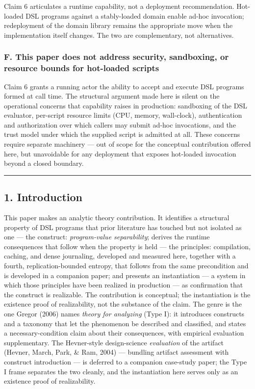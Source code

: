 \documentclass[
]{article}
\begin{document}
Claim 6 articulates a runtime capability, not a deployment
recommendation. Hot-loaded DSL programs against a stably-loaded domain
enable ad-hoc invocation; redeployment of the domain library remains the
appropriate move when the implementation itself changes. The two are
complementary, not alternatives.

\subsubsection{F. This paper does not address security, sandboxing, or
resource bounds for hot-loaded
scripts}\label{f.-this-paper-does-not-address-security-sandboxing-or-resource-bounds-for-hot-loaded-scripts}

Claim 6 grants a running actor the ability to accept and execute DSL
programs formed at call time. The structural argument made here is
silent on the operational concerns that capability raises in production:
sandboxing of the DSL evaluator, per-script resource limits (CPU,
memory, wall-clock), authentication and authorization over which callers
may submit ad-hoc invocations, and the trust model under which the
supplied script is admitted at all. These concerns require separate
machinery --- out of scope for the conceptual contribution offered here,
but unavoidable for any deployment that exposes hot-loaded invocation
beyond a closed boundary.

\begin{center}\rule{0.5\linewidth}{0.5pt}\end{center}

\subsection{1. Introduction}\label{introduction}

This paper makes an analytic theory contribution. It identifies a
structural property of DSL programs that prior literature has touched
but not isolated as one --- the construct: \emph{program-value
separability}; derives the runtime consequences that follow when the
property is held --- the principles: compilation, caching, and dense
journaling, developed and measured here, together with a fourth,
replication-bounded entropy, that follows from the same precondition and
is developed in a companion paper; and presents an instantiation --- a
system in which those principles have been realized in production --- as
confirmation that the construct is realizable. The contribution is
conceptual; the instantiation is the existence proof of realizability,
not the substance of the claim. The genre is the one Gregor (2006) names
\emph{theory for analyzing} (Type I): it introduces constructs and a
taxonomy that let the phenomenon be described and classified, and states
a necessary-condition claim about their consequences, with empirical
evaluation supplementary. The Hevner-style design-science
\emph{evaluation} of the artifact (Hevner, March, Park, \& Ram, 2004)
--- bundling artifact assessment with construct introduction --- is
deferred to a companion case-study paper; the Type I frame separates the
two cleanly, and the instantiation here serves only as an existence
proof of realizability.
\end{document}
